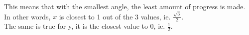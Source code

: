 \documentclass[preview]{standalone}
\begin{document}
\begin{center}
This means that with the smallest angle, the least amount of progress is made. \\ In other words, $x$ is closest to 1 out of the 3 values, ie. $ \frac{\sqrt{3}}{2} $. \\ The same is true for y, it is the closest value to 0, ie. $\frac{1}{2}.$
\end{center}
\end{document}
